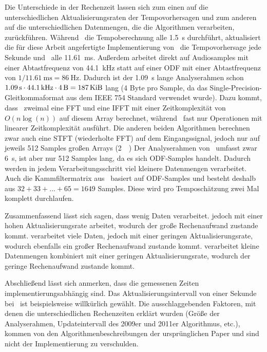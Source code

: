 {{		%
		Die Unterschiede in der Rechenzeit lassen sich zum einen auf die unterschiedlichen Aktualisierungsraten der Tempovorhersagen
			und zum anderen auf die unterschiedlichen Datenmengen,
			die die Algorithmen verarbeiten,
			zurückführen.
		Während~\cite{2009_DaPlSt} die Tempoberechnung alle \SI{1.5}{\second} durchführt,
			aktualisiert die für diese Arbeit angefertigte Implementierung von~\cite{2001_BeatThis} die Tempovorhersage jede Sekunde
			und~\cite{2011_PlRoSt} alle \SI{11.61}{\milli\second}.
		Au{\ss}erdem arbeitet \cite{2001_BeatThis} direkt auf Audiosamples
			mit einer Abtastfrequenz von \SI{44.1}{\kilo\hertz}
			statt auf einer \ac{ODF} mit einer Abtastfrequenz von $1 / \SI{11.61}{\milli\second} = \SI{86}{\hertz}$.
		Dadurch ist der \SI{1.09}{\second} lange Analyserahmen schon $\SI{1.09}{\second} \cdot \SI{44.1}{\kilo\hertz} \cdot \SI{4}{\byte} = \SI{187}{\kibi\byte}$ lang (\num{4} Byte pro Sample, da das Single-Precision-Gleitkommaformat aus dem \acs{IEEE} 754 Standard verwendet wurde).
		Dazu kommt,
			dass~\cite{2001_BeatThis} zweimal eine \ac{FFT} und eine \ac{IFFT} mit einer Zeitkomplexität von $O(n\log(n))$ auf diesem Array berechnet,
			während~\cite{2009_DaPlSt} fast nur Operationen mit linearer Zeitkomplexität ausführt.
		Die anderen beiden Algorithmen berechnen zwar auch eine \ac{STFT} (wiederholte \ac{FFT}) auf dem Eingangssignal,
			jedoch nur auf jeweils \num{512} Samples gro{\ss}en Arrays (\SI{2}{\kibi\byte})
		Der Analyserahmen von~\cite{2009_DaPlSt} umfasst zwar \SI{6}{\second},
			ist aber nur \num{512} Samples lang,
			da es sich \ac{ODF}-Samples handelt.
		Dadurch werden in jedem Verarbeitungsschritt viel kleinere Datenmengen verarbeitet.
		Auch die Kammfiltermatrix aus~\cite{2011_PlRoSt} basiert auf \ac{ODF}-Samples
			und besteht deshalb aus $32 + 33 + ... + 65 = 1649$ Samples.
		Diese wird pro Temposchätzung zwei Mal komplett durchlaufen.

		Zusammenfassend lässt sich sagen,
			dass \cite{2011_PlRoSt} wenig Daten verarbeitet.
			jedoch mit einer hohen Aktualisierungsrate arbeitet,
			wodurch der gro{\ss}e Rechenaufwand zustande kommt.
		\cite{2001_BeatThis} verarbeitet viele Daten,
			jedoch mit einer geringen Aktualisierungsrate,
			wodurch ebenfalls ein gro{\ss}er Rechenaufwand zustande kommt.
		\cite{2009_DaPlSt} verarbeitet kleine Datenmengen kombiniert mit einer geringen Aktualisierungsrate,
			wodurch der geringe Rechenaufwand zustande kommt.

		Abschlie{\ss}end lässt sich anmerken,
			dass die gemessenen Zeiten implementierungsabhängig sind.
		Das Aktualisierungsintervall von einer Sekunde bei~\cite{2001_BeatThis} ist beispielsweise willkürlich gewählt.
		Die ausschlaggebenden Faktoren,
			mit denen die unterschiedlichen Rechenzeiten erklärt wurden
			(Grö{\ss}e der Analyserahmen, Updateintervall des 2009er und 2011er Algorithmus, etc.),
			kommen von den Algorithmenbeschreibungen der ursprünglichen Paper
			und sind nicht der Implementierung zu verschulden.
	}
}
